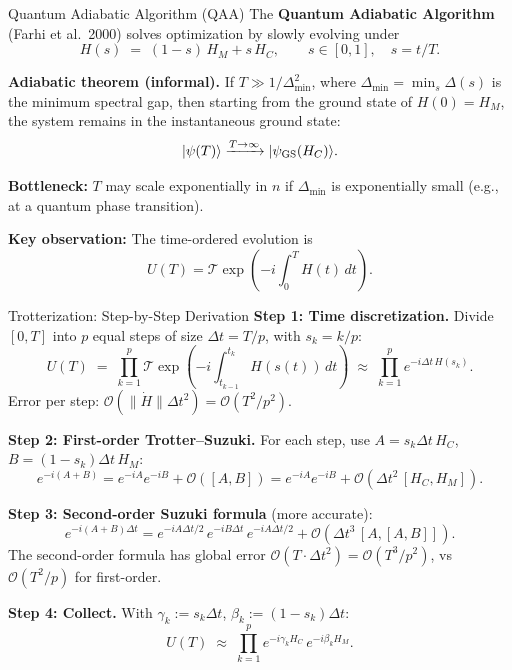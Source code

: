 \documentclass{beamer}
\begin{document}
\begin{frame}
\begin{frame}{Quantum Adiabatic Algorithm (QAA)}
The \textbf{Quantum Adiabatic Algorithm} (Farhi et al.\ 2000) solves
optimization by slowly evolving under
\[
H(s) \;=\; (1-s)\,H_M + s\,H_C, \qquad s \in [0,1],\quad s = t/T.
\]

\textbf{Adiabatic theorem (informal).}  If $T\gg 1/\Delta_{\min}^2$,
where $\Delta_{\min} = \min_{s}\Delta(s)$ is the minimum spectral gap,
then starting from the ground state of $H(0) = H_M$, the system
remains in the instantaneous ground state:
\[
|\psi(T)\rangle \xrightarrow{T\to\infty} |\psi_{\rm GS}(H_C)\rangle.
\]

\textbf{Bottleneck:} $T$ may scale exponentially in $n$ if
$\Delta_{\min}$ is exponentially small (e.g., at a quantum phase
transition).

\textbf{Key observation:} The time-ordered evolution is
\[
U(T) = \mathcal{T}\exp\!\left(-i\int_0^T H(t)\,dt\right).
\]
\end{frame}


\begin{frame}{Trotterization: Step-by-Step Derivation}
\textbf{Step 1: Time discretization.}
Divide $[0,T]$ into $p$ equal steps of size $\Delta t = T/p$,
with $s_k = k/p$:
\[
U(T) \;=\; \prod_{k=1}^p \mathcal{T}\exp\!\left(
-i\int_{t_{k-1}}^{t_k} H(s(t))\,dt\right)
\;\approx\; \prod_{k=1}^p e^{-i\Delta t\, H(s_k)}.
\]
Error per step: $\mathcal{O}(\|\dot{H}\|\Delta t^2) = \mathcal{O}(T^2/p^2)$.

\medskip

\textbf{Step 2: First-order Trotter--Suzuki.}
For each step, use $A = s_k\Delta t\,H_C$, $B=(1-s_k)\Delta t\,H_M$:
\[
e^{-i(A+B)}
= e^{-iA}e^{-iB} + \mathcal{O}([A,B])
= e^{-iA}e^{-iB} + \mathcal{O}(\Delta t^2\,[H_C,H_M]).
\]

\textbf{Step 3: Second-order Suzuki formula} (more accurate):
\[
e^{-i(A+B)\Delta t}
= e^{-iA\Delta t/2}\,e^{-iB\Delta t}\,e^{-iA\Delta t/2}
+ \mathcal{O}(\Delta t^3\,[A,[A,B]]).
\]
The second-order formula has global error $\mathcal{O}(T\cdot\Delta t^2)
= \mathcal{O}(T^3/p^2)$, vs $\mathcal{O}(T^2/p)$ for first-order.

\textbf{Step 4: Collect.} With $\gamma_k := s_k\Delta t$, $\beta_k := (1-s_k)\Delta t$:
\[
U(T) \;\approx\; \prod_{k=1}^p e^{-i\gamma_k H_C}\,e^{-i\beta_k H_M}.
\]
\end{frame}



\end{frame}
\end{document}
